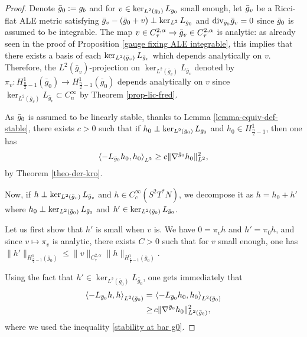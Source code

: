 \documentclass[a4paper,11pt,reqno]{amsart}
\numberwithin{equation}{section}
\begin{document}
	\begin{proof}
	Denote $\Bar{g}_0:=g_b$ and for $v\in \ker_{L^2(\Bar{g}_0)} L_{\Bar{g}_0}$ small enough, let $\Bar{g}_v$ be a Ricci-flat ALE metric satisfying $\Bar{g}_v-(\Bar{g}_0+v)\perp \ker_{L^2}L_{\Bar{g}_0}$ and $\textup{div}_{\bar{g}_0}\bar{g}_v=0$ since $\Bar{g}_0$ is assumed to be integrable. The map $v\in C^{2,\alpha}_\tau\rightarrow \Bar{g}_v\in C^{2,\alpha}_\tau$ is analytic: as already seen in the proof of Proposition \ref{gauge fixing ALE integrable}, this implies that there exists a basis of each $\ker_{L^2(\bar{g}_v)} L_{\Bar{g}_v}$ which depends analytically on $v$. Therefore, the $L^2(\bar{g}_v)$-projection on $\ker_{L^2(\bar{g}_v)}L_{\bar{g}_v}$ denoted by $\pi_v: H_{\frac{n}{2}-1}^1(\bar{g}_0)\to H^1_{\frac{n}{2}-1}(\bar{g}_0)$ depends analytically on $v$ since $\ker_{L^2(\bar{g}_v)}L_{\bar{g}_v}\subset C^\infty_n$ by Theorem \ref{prop-lic-fred}.
	
As $\Bar{g}_0$ is assumed to be linearly stable, thanks to Lemma \ref{lemma-equiv-def-stable}, there exists $c>0$ such that if $h_0\perp \ker_{L^2(\bar{g}_0)} L_{\Bar{g}_0}$ and $h_0\in H^1_{\frac{n}{2}-1}$, then one has
\begin{equation}
    \left<-L_{\Bar{g}_0} h_0,h_0\right>_{L^2}\geq c\|\nabla^{\Bar{g}_0}h_0\|_{L^2}^2,\label{stability at bar g0}
\end{equation}
by Theorem \ref{theo-der-kro}.

Now, if $h\perp \ker_{L^2(\bar{g}_v)} L_{\Bar{g}_v}$ and $h\in C_c^\infty(S^2T^*N)$, we decompose it as $h = h_0+h'$ where
$h_0\perp \ker_{L^2(\bar{g}_0)} L_{\Bar{g}_0}$ and $h'\in \ker_{L^2(\bar{g}_0)} L_{\Bar{g}_0}$. 

Let us first show that $h'$ is small when $v$ is. We have $0 = \pi_vh$ and $h' = \pi_0 h$, and since $v\mapsto \pi_v$ is analytic, there exists $C>0$ such that for $v$ small enough, one has $\|h'\|_{H^1_{\frac{n}{2}-1}(\bar{g}_0)}\leq \|v\|_{C^{2,\alpha}_{\tau}}\|h\|_{H^1_{\frac{n}{2}-1}(\bar{g}_0)}$. 

Using the fact that $h'\in\ker_{L^2(\bar{g}_0)} L_{\bar{g}_0}$, one gets immediately that
\begin{equation*}
\begin{split}
\left<-L_{\Bar{g}_0} h,h\right>_{L^2(\bar{g}_0)}=\,&\left<-L_{\Bar{g}_0} h_0,h_0\right>_{L^2(\bar{g}_0)}\\
\geq\,& c\|\nabla^{\Bar{g}_0}h_0\|_{L^2(\bar{g}_0)}^2,
\end{split}
\end{equation*}
where we used the inequality \eqref{stability at bar g0}.


\end{proof}
\end{document}
